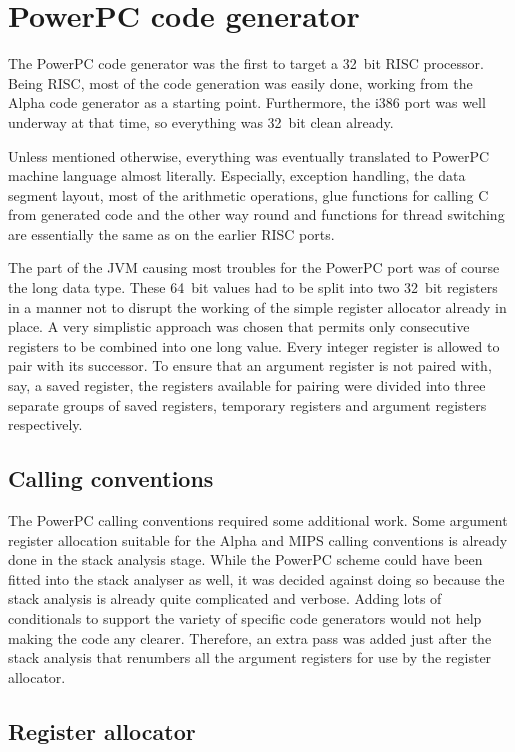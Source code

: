 \section{PowerPC code generator}

The PowerPC code generator was the first to target a 32~bit RISC processor.
Being RISC, most of the code generation was easily done, working from the Alpha
code generator as a starting point. Furthermore, the i386 port was well
underway at that time, so everything was 32~bit clean already.

Unless mentioned otherwise, everything was eventually translated to PowerPC
machine language almost literally. Especially, exception handling, the data
segment layout, most of the arithmetic operations, glue functions for calling C
from generated code and the other way round and functions for thread switching
are essentially the same as on the earlier RISC ports.

The part of the JVM causing most troubles for the PowerPC port was of course
the long data type. These 64~bit values had to be split into two 32~bit
registers in a manner not to disrupt the working of the simple register
allocator already in place. A very simplistic approach was chosen that permits
only consecutive registers to be combined into one long value. Every integer
register is allowed to pair with its successor. To ensure that an argument
register is not paired with, say, a saved register, the registers available for
pairing were divided into three separate groups of saved registers, temporary
registers and argument registers respectively.

\subsection{Calling conventions}

The PowerPC calling conventions required some additional work. Some argument
register allocation suitable for the Alpha and MIPS calling conventions is
already done in the stack analysis stage. While the PowerPC scheme could have
been fitted into the stack analyser as well, it was decided against doing so
because the stack analysis is already quite complicated and verbose. Adding
lots of conditionals to support the variety of specific code generators would
not help making the code any clearer. Therefore, an extra pass was added just
after the stack analysis that renumbers all the argument registers for use by
the register allocator.

\subsection{Register allocator}

